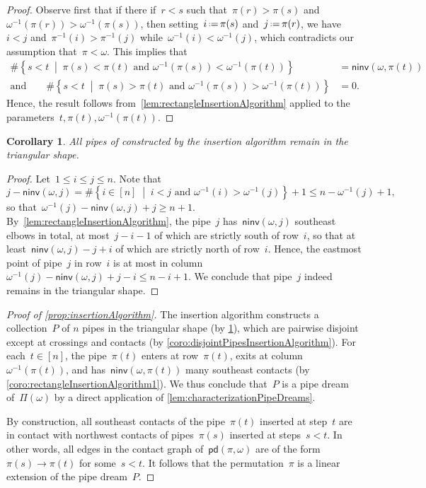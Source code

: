 \documentclass{amsart}
\newtheorem{corollary}[theorem]{Corollary}
\theoremstyle{definition}
\newcommand{\set}[2]{\left\{ #1 \;\middle|\; #2 \right\}} %
\newcommand{\eqdef}{\mbox{\,\raisebox{0.2ex}{\scriptsize\ensuremath{\mathrm:}}\ensuremath{=}\,}} %
\newcommand{\pipeDreams}{\Pi} %
\newcommand{\noninversions}[2]{\mathsf{ninv}(#1,#2)} %
\newcommand{\insertion}[2]{\mathsf{pd}(#1,#2)} %
\begin{document}
\begin{proof}
Observe first that if there if~$r < s$ such that~$\pi(r) > \pi(s)$ and~$\omega^{-1}(\pi(r)) > \omega^{-1}(\pi(s))$, then setting~$i \eqdef \pi(s)$ and~$j \eqdef \pi(r)$, we have~${i < j}$ and~$\pi^{-1}(i) > \pi^{-1}(j)$ while~$\omega^{-1}(i) < \omega^{-1}(j)$, which contradicts our assumption that~$\pi < \omega$.
This implies that
\begin{align*}
\# \set{s < t}{\pi(s) < \pi(t) \text{ and } \omega^{-1}(\pi(s)) < \omega^{-1}(\pi(t))} & = \noninversions{\omega}{\pi(t)} \\
\text{and}\qquad \# \set{s < t}{\pi(s) > \pi(t) \text{ and } \omega^{-1}(\pi(s)) > \omega^{-1}(\pi(t))} & = 0.
\end{align*}
Hence, the result follows from~\cref{lem:rectangleInsertionAlgorithm} applied to the parameters~$t, \pi(t), \omega^{-1}(\pi(t))$.
\end{proof}

\begin{corollary}
\label{coro:rectangleInsertionAlgorithm2}
All pipes of constructed by the insertion algorithm remain in the triangular shape.
\end{corollary}

\begin{proof}
Let~$1 \le i \le j \le n$.
Note that
\[
j - \noninversions{\omega}{j} = \#\set{i \in [n]}{i < j \text{ and } \omega^{-1}(i) > \omega^{-1}(j)} + 1 \le n - \omega^{-1}(j) + 1,
\]
so that~$\omega^{-1}(j) - \noninversions{\omega}{j} + j \ge n + 1$.
By~\cref{lem:rectangleInsertionAlgorithm}, the pipe~$j$ has~$\noninversions{\omega}{j}$ southeast elbows in total, at most~$j-i-1$ of which are strictly south of row~$i$, so that at least~$\noninversions{\omega}{j} - j + i$ of which are strictly north of row~$i$.
Hence, the eastmost point of pipe~$j$ in row~$i$ is at most in column~$\omega^{-1}(j) - \noninversions{\omega}{j} + j - i \le n - i + 1$.
We conclude that pipe~$j$ indeed remains in the triangular shape.
\end{proof}

\begin{proof}[Proof of \cref{prop:insertionAlgorithm}]
The insertion algorithm constructs a collection~$P$ of $n$ pipes in the triangular shape (by \cref{coro:rectangleInsertionAlgorithm2}), which are pairwise disjoint except at crossings and contacts (by \cref{coro:disjointPipesInsertionAlgorithm}).
For each~$t \in [n]$, the pipe~$\pi(t)$ enters at row~$\pi(t)$, exits at column~$\omega^{-1}(\pi(t))$, and has~$\noninversions{\omega}{\pi(t)}$ many southeast contacts (by \cref{coro:rectangleInsertionAlgorithm1}).
We thus conclude that~$P$ is a pipe dream of~$\pipeDreams(\omega)$ by a direct application of \cref{lem:characterizationPipeDreams}.

By construction, all southeast contacts of the pipe~$\pi(t)$ inserted at step~$t$ are in contact with northwest contacts of pipes~$\pi(s)$ inserted at steps~$s < t$.
In other words, all edges in the contact graph of~$\insertion{\pi}{\omega}$ are of the form~$\pi(s) \to \pi(t)$ for some~$s < t$.
It follows that the permutation~$\pi$ is a linear extension of the pipe dream~$P$.
\end{proof}
\end{document}
